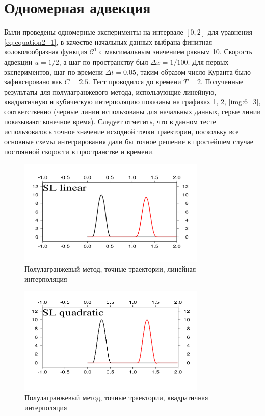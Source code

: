 \section*{Одномерная адвекция} \label{sect6_1}
Были проведены одномерные эксперименты на интервале $[0, 2]$ для уравнения \eqref{eq:equation2_1}, в качестве начальных данных выбрана финитная колоколообразная функция $\mathcal{C}^1$ с максимальным значением равным 10. Скорость адвекции $u=1/2$, а шаг по пространству был $\Delta x=1/100$. Для первых экспериментов, шаг по времени $\Delta t = 0.05$, таким образом число Куранта было зафиксировано как $C=2.5$. Тест проводился до времени $T=2$. Полученные результаты для полулагранжевого метода, использующие линейную, квадратичную и кубическую интерполяцию показаны на графиках \ref{img:6_1}, \ref{img:6_2}, \ref{img:6_3}, соответственно (черные линии использованы для начальных данных, серые линии показывают конечное время). Следует отметить, что в данном тесте использовалось точное значение исходной точки траектории, поскольку все основные схемы интегрирования дали бы точное решение в простейшем случае постоянной скорости в пространстве и времени.
%
\begin{figure}[ht] 
	\centering
	\includegraphics[width=0.8\textwidth,height=0.5\textwidth]{images/6_1}
	\caption{Полулагранжевый метод, точные траектории, линейная интерполяция}
	\label{img:6_1}
\end{figure}
%
%
\begin{figure}[ht] 
	\centering
	\includegraphics[width=0.8\textwidth,height=0.5\textwidth]{images/6_2}
	\caption{Полулагранжевый метод, точные траектории, квадратичная интерполяция}
	\label{img:6_2}
\end{figure}
